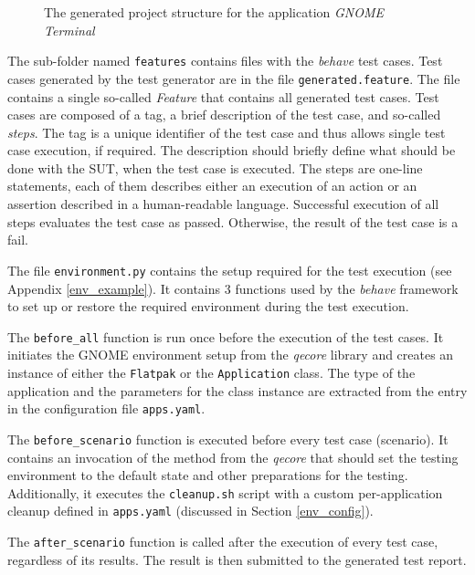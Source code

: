 \begin{figure}[htb!]
\caption{The generated project structure for the application \textit{GNOME Terminal}}
\label{project_folder}
\end{figure}

The sub-folder named \texttt{features} contains files with the \textit{behave} test cases. Test cases generated by the test generator are in the file \texttt{generated.feature}. The file contains a single so-called \textit{Feature} that contains all generated test cases. Test cases are composed of a tag, a brief description of the test case, and so-called \textit{steps}. The tag is a unique identifier of the test case and thus allows single test case execution, if required. The description should briefly define what should be done with the SUT, when the test case is executed. The steps are one-line statements, each of them describes either an execution of an action or an assertion described in a human-readable language. Successful execution of all steps evaluates the test case as passed. Otherwise, the result of the test case is a fail.

The file \texttt{environment.py} contains the setup required for the test execution (see Appendix \ref{env_example}). It contains 3 functions used by the \textit{behave} framework to set up or restore the required environment during the test execution. 

The \texttt{before\_all} function is run once before the execution of the test cases. It initiates the GNOME environment setup from the \textit{qecore} library and creates an instance of either the \texttt{Flatpak} or the \texttt{Application} class. The type of the application and the parameters for the class instance are extracted from the entry in the configuration file \texttt{apps.yaml}. 

The \texttt{before\_scenario} function is executed before every test case (scenario). It contains an invocation of the method from the \textit{qecore} that should set the testing environment to the default state and other preparations for the testing. Additionally, it executes the \texttt{cleanup.sh} script with a custom per-application cleanup defined in \texttt{apps.yaml} (discussed in Section \ref{env_config}). 

The \texttt{after\_scenario} function is called after the execution of every test case, regardless of its results. The result is then submitted to the generated test report.

